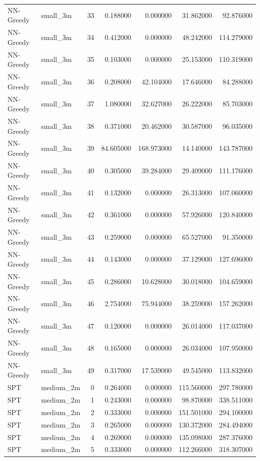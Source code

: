 \begin{tabular}{llrrrrr}
NN-Greedy & small_3m & 33 & 0.188000 & 0.000000 & 31.862000 & 92.876000 \\
NN-Greedy & small_3m & 34 & 0.412000 & 0.000000 & 48.242000 & 114.279000 \\
NN-Greedy & small_3m & 35 & 0.103000 & 0.000000 & 25.153000 & 110.319000 \\
NN-Greedy & small_3m & 36 & 0.208000 & 42.104000 & 17.646000 & 84.288000 \\
NN-Greedy & small_3m & 37 & 1.080000 & 32.627000 & 26.222000 & 85.703000 \\
NN-Greedy & small_3m & 38 & 0.371000 & 20.462000 & 30.587000 & 96.035000 \\
NN-Greedy & small_3m & 39 & 84.605000 & 168.973000 & 14.140000 & 143.787000 \\
NN-Greedy & small_3m & 40 & 0.305000 & 39.284000 & 29.409000 & 111.176000 \\
NN-Greedy & small_3m & 41 & 0.132000 & 0.000000 & 26.313000 & 107.060000 \\
NN-Greedy & small_3m & 42 & 0.361000 & 0.000000 & 57.926000 & 120.840000 \\
NN-Greedy & small_3m & 43 & 0.259000 & 0.000000 & 65.527000 & 91.350000 \\
NN-Greedy & small_3m & 44 & 0.143000 & 0.000000 & 37.129000 & 127.696000 \\
NN-Greedy & small_3m & 45 & 0.286000 & 10.628000 & 30.018000 & 104.659000 \\
NN-Greedy & small_3m & 46 & 2.754000 & 75.944000 & 38.259000 & 157.262000 \\
NN-Greedy & small_3m & 47 & 0.120000 & 0.000000 & 26.014000 & 117.037000 \\
NN-Greedy & small_3m & 48 & 0.165000 & 0.000000 & 26.034000 & 107.950000 \\
NN-Greedy & small_3m & 49 & 0.317000 & 17.539000 & 49.545000 & 113.832000 \\
SPT & medium_2m & 0 & 0.264000 & 0.000000 & 115.560000 & 297.780000 \\
SPT & medium_2m & 1 & 0.243000 & 0.000000 & 98.870000 & 338.511000 \\
SPT & medium_2m & 2 & 0.333000 & 0.000000 & 151.501000 & 294.100000 \\
SPT & medium_2m & 3 & 0.265000 & 0.000000 & 130.372000 & 284.494000 \\
SPT & medium_2m & 4 & 0.269000 & 0.000000 & 135.098000 & 287.376000 \\
SPT & medium_2m & 5 & 0.333000 & 0.000000 & 112.266000 & 318.307000 \\

\end{tabular}
